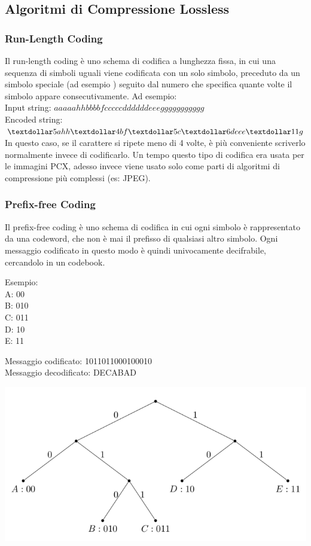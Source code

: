 \documentclass[a4paper,11pt]{article} %
\begin{document}
\subsection{Algoritmi di Compressione Lossless}

\subsubsection{Run-Length Coding}
Il run-length coding  è uno schema di codifica a lunghezza fissa, in cui una sequenza di simboli uguali viene codificata con un solo simbolo, preceduto da un simbolo speciale (ad esempio \textdollar) seguito dal numero che specifica quante volte il simbolo appare consecutivamente. Ad esempio:\\
Input string: $aaaaahhbbbbfcccccddddddeeeggggggggggg$ \\
Encoded string: $ \textdollar 5ahh \textdollar 4bf \textdollar 5c \textdollar 6deee \textdollar 11g$\\
In questo caso, se il carattere si ripete meno di 4 volte, è più conveniente scriverlo normalmente invece di codificarlo. Un tempo questo tipo di codifica era usata per le immagini PCX, adesso invece viene usato solo come parti di algoritmi di compressione più complessi (es: JPEG).

\subsubsection{Prefix-free Coding}
Il prefix-free coding è uno schema di codifica in cui ogni simbolo è rappresentato da una codeword, che non è mai il prefisso di qualsiasi altro simbolo. Ogni messaggio codificato in questo modo è quindi univocamente decifrabile, cercandolo in un codebook. \\
\begin{minipage}{0.15\textwidth}
Esempio: \\
A: 00 \\
B: 010\\
C: 011\\
D: 10 \\
E: 11 \\
\end{minipage}
\begin{minipage}{0.45\textwidth}
Messaggio codificato: 1011011000100010\\
Messaggio decodificato: DECABAD
\end{minipage}
\begin{minipage}{0.4\textwidth}
\centering
    \includegraphics[width=\linewidth]{PrefixFreeTree}
\end{minipage}
\end{document}
